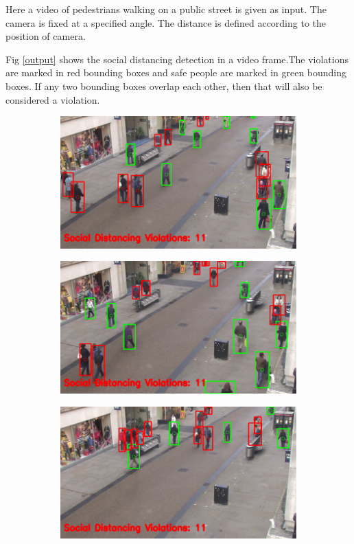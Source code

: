 \documentclass[conference]{IEEEtran}
\begin{document}
Here a video of pedestrians walking on a public street is given as input. The camera is fixed at a specified angle. The distance is defined according to the position of camera. 
\par
Fig \ref{output} shows the social distancing detection in a video frame.The violations are marked in red bounding boxes and safe people are marked in green bounding boxes. If any two bounding boxes overlap each other, then that will also be considered a violation. 
\begin{figure}[!h]
	\centering
	\begin{subfigure}[b]{0.8\columnwidth}
		\includegraphics[width=\linewidth]{./images/v1.png}
		\caption{}
	\end{subfigure}
	\begin{subfigure}[b]{0.8\columnwidth}
		\includegraphics[width=\linewidth]{./images/v2.png}
		\caption{}
	\end{subfigure}
	\begin{subfigure}[b]{0.8\columnwidth}
		\includegraphics[width=\linewidth]{./images/v4.png}

\end{subfigure}
\end{figure}
\end{document}
